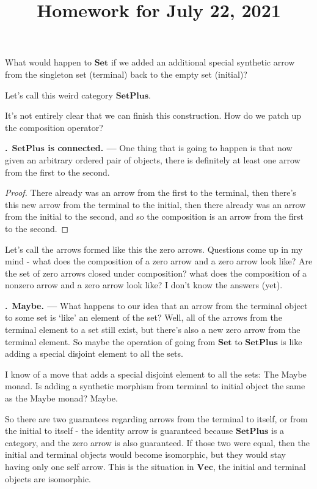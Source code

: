 \documentclass[11pt,noamsfonts]{amsart}
\title{Homework for July 22, 2021}
\newcommand{\pointheader}{\vspace{2mm}\noindent\refstepcounter{section}\textbf{\thesection.}}
\newcommand{\tpoint}[1]{\pointheader~{\bf #1. ---}}
\begin{document}
\maketitle


What would happen to \( \mathbf{Set} \) if we added an additional special synthetic arrow from the singleton set (terminal) back to the empty set (initial)?

Let's call this weird category \( \mathbf{SetPlus} \).

It's not entirely clear that we can finish this construction. How do we patch up the composition operator?

\tpoint{\( \mathbf{SetPlus} \) is connected} One thing that is going to happen is that now given an arbitrary ordered pair of objects, there is definitely at least one arrow from the first to the second.

\begin{proof}
There already was an arrow from the first to the terminal, then there's this new arrow from the terminal to the initial, then there already was an arrow from the initial to the second, and so the composition is an arrow from the first to the second.
\end{proof}

Let's call the arrows formed like this the zero arrows. Questions come up in my mind - what does the composition of a zero arrow and a zero arrow look like? Are the set of zero arrows closed under composition? what does the composition of a nonzero arrow and a zero arrow look like? I don't know the answers (yet). 

\tpoint{Maybe}
What happens to our idea that an arrow from the terminal object to some set is `like' an element of the set? Well, all of the arrows from the terminal element to a set still exist, but there's also a new zero arrow from the terminal element. So maybe the operation of going from \( \mathbf{Set} \) to \( \mathbf{SetPlus} \) is like adding a special disjoint element to all the sets.

I know of a move that adds a special disjoint element to all the sets: The Maybe monad. Is adding a synthetic morphism from terminal to initial object the same as the Maybe monad? Maybe.

So there are two guarantees regarding arrows from the terminal to itself, or from the initial to itself - the identity arrow is guaranteed because \( \mathbf{SetPlus} \) is a category, and the zero arrow is also guaranteed. If those two were equal, then the initial and terminal objects would become isomorphic, but they would stay having only one self arrow. This is the situation in \( \mathbf{Vec} \), the initial and terminal objects are isomorphic.
\end{document}
